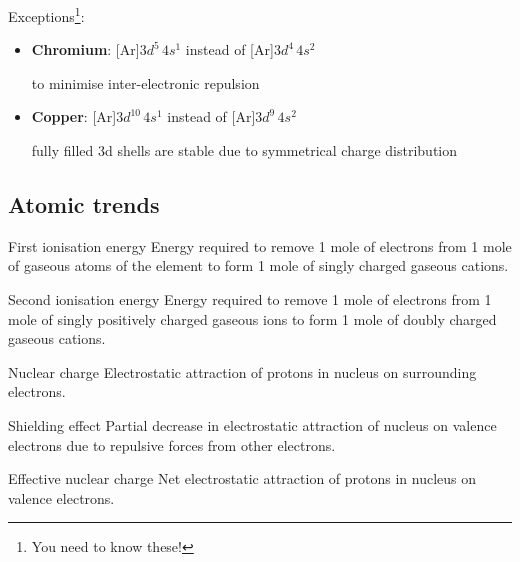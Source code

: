 Exceptions\footnote{You need to know these!}:
\begin{itemize}
\item \textbf{Chromium}: [Ar]$\unit{3d^5\,4s^1}$ instead of [Ar]$\unit{3d^4\,4s^2}$

to minimise inter-electronic repulsion

\item \textbf{Copper}: [Ar]$\unit{3d^{10}\,4s^1}$ instead of [Ar]$\unit{3d^9\,4s^2}$

fully filled 3d shells are stable due to symmetrical charge distribution
\end{itemize}


\subsection{Atomic trends}
\begin{defn}{First ionisation energy}{}
Energy required to remove 1 mole of electrons from 1 mole of gaseous atoms of the element to form 1 mole of singly charged gaseous cations.
\end{defn}

\begin{defn}{Second ionisation energy}{}
Energy required to remove 1 mole of electrons from 1 mole of singly positively charged gaseous ions to form 1 mole of doubly charged gaseous cations.
\end{defn}

\begin{defn}{Nuclear charge}{}
Electrostatic attraction of protons in nucleus on surrounding electrons.
\end{defn}

\begin{defn}{Shielding effect}{}
Partial decrease in electrostatic attraction of nucleus on valence electrons due to repulsive forces from other electrons.
\end{defn}

\begin{defn}{Effective nuclear charge}{}
Net electrostatic attraction of protons in nucleus on valence electrons.
\end{defn}
\pagebreak